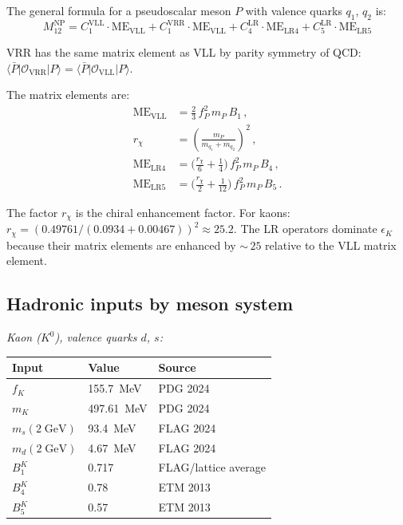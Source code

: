 \documentclass[11pt]{article}
\begin{document}
The general formula for a pseudoscalar meson $P$ with valence quarks $q_1$,
$q_2$ is:
\begin{equation}
  M_{12}^{\mathrm{NP}} = C_1^{\mathrm{VLL}} \cdot \mathrm{ME}_{\mathrm{VLL}}
    + C_1^{\mathrm{VRR}} \cdot \mathrm{ME}_{\mathrm{VLL}}
    + C_4^{\mathrm{LR}} \cdot \mathrm{ME}_{\mathrm{LR4}}
    + C_5^{\mathrm{LR}} \cdot \mathrm{ME}_{\mathrm{LR5}}
\end{equation}

VRR has the same matrix element as VLL by parity symmetry of QCD:
$\langle\bar{P}|\mathcal{O}_{\mathrm{VRR}}|P\rangle =
\langle\bar{P}|\mathcal{O}_{\mathrm{VLL}}|P\rangle$.

The matrix elements are:
\begin{align}
  \mathrm{ME}_{\mathrm{VLL}} &= \tfrac{2}{3}\,f_P^2\,m_P\,B_1\,, \\[4pt]
  r_{\chi} &= \left(\frac{m_P}{m_{q_1} + m_{q_2}}\right)^2\,, \\[4pt]
  \mathrm{ME}_{\mathrm{LR4}} &= \bigl(\tfrac{r_{\chi}}{6}
    + \tfrac{1}{4}\bigr)\,f_P^2\,m_P\,B_4\,, \\[4pt]
  \mathrm{ME}_{\mathrm{LR5}} &= \bigl(\tfrac{r_{\chi}}{2}
    + \tfrac{1}{12}\bigr)\,f_P^2\,m_P\,B_5\,.
\end{align}

The factor $r_{\chi}$ is the chiral enhancement factor.  For kaons:
$r_{\chi} = (0.49761/(0.0934 + 0.00467))^2 \approx 25.2$.
The LR operators dominate $\epsilon_K$ because their matrix elements are
enhanced by ${\sim}\,25$ relative to the VLL matrix element.

\subsection{Hadronic inputs by meson system}

\noindent\emph{Kaon ($K^0$), valence quarks $d$, $s$:}

\begin{table}[h]
\centering
\begin{tabular}{@{}lll@{}}
\toprule
Input & Value & Source \\
\midrule
$f_K$ & 155.7~MeV & PDG 2024 \\
$m_K$ & 497.61~MeV & PDG 2024 \\
$m_s(2\;\text{GeV})$ & 93.4~MeV & FLAG 2024 \\
$m_d(2\;\text{GeV})$ & 4.67~MeV & FLAG 2024 \\
$B_1^K$ & 0.717 & FLAG/lattice average \\
$B_4^K$ & 0.78 & ETM 2013 \\
$B_5^K$ & 0.57 & ETM 2013 \\
\bottomrule
\end{tabular}
\end{table}
\end{document}
